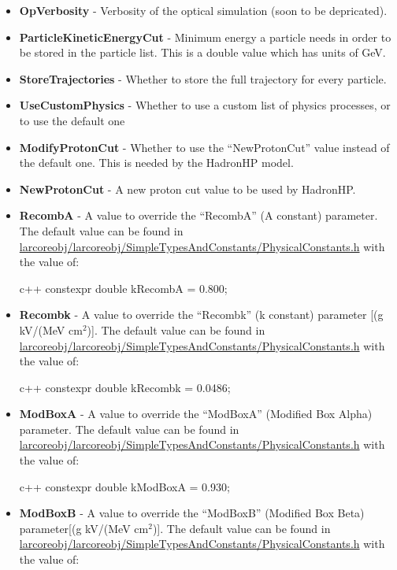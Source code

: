 \documentclass[8pt]{refart}
\begin{document}
\begin{itemize}
    \item \textbf{OpVerbosity} - Verbosity of the optical simulation (soon to be depricated).
    \item \textbf{ParticleKineticEnergyCut} - Minimum energy a particle needs in order to be stored in the particle list.  This is a double value which has units of GeV.
    \item \textbf{StoreTrajectories} - Whether to store the full trajectory for every particle.
    \item \textbf{UseCustomPhysics} - Whether to use a custom list of physics processes, or to use the default one
    \item \textbf{ModifyProtonCut} - Whether to use the ``NewProtonCut'' value instead of the default one.  This is needed by the HadronHP model.
    \item \textbf{NewProtonCut} - A new proton cut value to be used by HadronHP.
    \item \textbf{RecombA} - A value to override the ``RecombA'' (A constant) parameter.  The default value can be found in \href{https://internal.dunescience.org/doxygen/PhysicalConstants_8h_source.html}{larcoreobj/larcoreobj/SimpleTypesAndConstants/PhysicalConstants.h} with the value of:
        \begin{code}[35]{c++}
        constexpr double kRecombA       = 0.800;
        \end{code}
    \item \textbf{Recombk} - A value to override the ``Recombk'' (k constant) parameter [(g kV/(MeV cm$^2$)].  The default value can be found in \href{https://internal.dunescience.org/doxygen/PhysicalConstants_8h_source.html}{larcoreobj/larcoreobj/SimpleTypesAndConstants/PhysicalConstants.h} with the value of:
        \begin{code}[36]{c++}
        constexpr double kRecombk       = 0.0486;
        \end{code}
    \item \textbf{ModBoxA} - A value to override the ``ModBoxA'' (Modified Box Alpha) parameter.  The default value can be found in \href{https://internal.dunescience.org/doxygen/PhysicalConstants_8h_source.html}{larcoreobj/larcoreobj/SimpleTypesAndConstants/PhysicalConstants.h} with the value of:
        \begin{code}[36]{c++}
        constexpr double kModBoxA       = 0.930;
        \end{code}
    \item \textbf{ModBoxB} - A value to override the ``ModBoxB'' (Modified Box Beta) parameter[(g kV/(MeV cm$^2$)].  The default value can be found in \href{https://internal.dunescience.org/doxygen/PhysicalConstants_8h_source.html}{larcoreobj/larcoreobj/SimpleTypesAndConstants/PhysicalConstants.h} with the value of:

\end{itemize}
\end{document}
